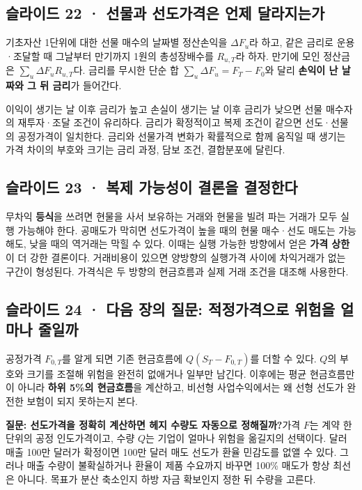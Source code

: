 \documentclass[11pt,a4paper]{article}
\begin{document}
\subsection{슬라이드 22 · 선물과 선도가격은 언제 달라지는가}
기초자산 1단위에 대한 선물 매수의 날짜별 정산손익을 $\Delta F_u$라 하고, 같은 금리로 운용·조달할 때 그날부터 만기까지 1원의 총성장배수를 $R_{u,T}$라 하자. 만기에 모인 정산금은 $\sum_u\Delta F_uR_{u,T}$다. 금리를 무시한 단순 합 $\sum_u\Delta F_u=F_T-F_0$와 달리 \textbf{손익이 난 날짜와 그 뒤 금리}가 들어간다.\par

이익이 생기는 날 이후 금리가 높고 손실이 생기는 날 이후 금리가 낮으면 선물 매수자의 재투자·조달 조건이 유리하다. 금리가 확정적이고 복제 조건이 같으면 선도·선물의 공정가격이 일치한다. 금리와 선물가격 변화가 확률적으로 함께 움직일 때 생기는 가격 차이의 부호와 크기는 금리 과정, 담보 조건, 결합분포에 달린다.\par

\subsection{슬라이드 23 · 복제 가능성이 결론을 결정한다}
무차익 \textbf{등식}을 쓰려면 현물을 사서 보유하는 거래와 현물을 빌려 파는 거래가 모두 실행 가능해야 한다. 공매도가 막히면 선도가격이 높을 때의 현물 매수·선도 매도는 가능해도, 낮을 때의 역거래는 막힐 수 있다. 이때는 실행 가능한 방향에서 얻은 \textbf{가격 상한}이 더 강한 결론이다. 거래비용이 있으면 양방향의 실행가격 사이에 차익거래가 없는 구간이 형성된다. 가격식은 두 방향의 현금흐름과 실제 거래 조건을 대조해 사용한다.\par

\subsection{슬라이드 24 · 다음 장의 질문: 적정가격으로 위험을 얼마나 줄일까}
공정가격 $F_{0,T}$를 알게 되면 기존 현금흐름에 $Q(S_T-F_{0,T})$를 더할 수 있다. $Q$의 부호와 크기를 조절해 위험을 완전히 없애거나 일부만 남긴다. 이후에는 평균 현금흐름만이 아니라 \textbf{하위 5\%의 현금흐름}을 계산하고, 비선형 사업수익에서는 왜 선형 선도가 완전한 보험이 되지 못하는지 본다.\par

\par\medskip\noindent\textbf{질문: 선도가격을 정확히 계산하면 헤지 수량도 자동으로 정해질까?}\quad 가격 $F$는 계약 한 단위의 공정 인도가격이고, 수량 $Q$는 기업이 얼마나 위험을 옮길지의 선택이다. 달러 매출 100만 달러가 확정이면 100만 달러 매도 선도가 환율 민감도를 없앨 수 있다. 그러나 매출 수량이 불확실하거나 환율이 제품 수요까지 바꾸면 100\% 매도가 항상 최선은 아니다. 목표가 분산 축소인지 하방 자금 확보인지 정한 뒤 수량을 고른다.\par
\end{document}
